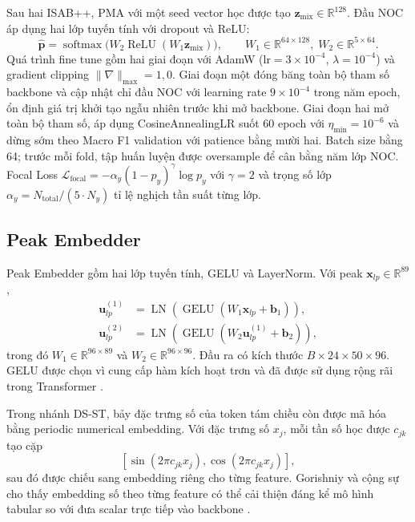 \documentclass[12pt,a4paper]{article}
\begin{document}
Sau hai ISAB++, PMA với một seed vector học được tạo $\bm{z}_{\mathrm{mix}}\in\mathbb{R}^{128}$. Đầu NOC áp dụng hai lớp tuyến tính với dropout và ReLU:
\begin{equation}
\hat{\bm{p}} = \operatorname{softmax}\!\bigl(W_2\operatorname{ReLU}(W_1\bm{z}_{\mathrm{mix}})\bigr),
\qquad W_1\in\mathbb{R}^{64\times128},\;W_2\in\mathbb{R}^{5\times64}.
\end{equation}
Quá trình fine tune gồm hai giai đoạn với AdamW ($\text{lr}=3\times10^{-4}$, $\lambda=10^{-4}$) và gradient clipping $\|\nabla\|_{\max}=1{,}0$. Giai đoạn một đóng băng toàn bộ tham số backbone và cập nhật chỉ đầu NOC với learning rate $9\times10^{-4}$ trong năm epoch, ổn định giá trị khởi tạo ngẫu nhiên trước khi mở backbone. Giai đoạn hai mở toàn bộ tham số, áp dụng CosineAnnealingLR suốt 60 epoch với $\eta_{\min}=10^{-6}$ và dừng sớm theo Macro F1 validation với patience bằng mười hai. Batch size bằng 64; trước mỗi fold, tập huấn luyện được oversample để cân bằng năm lớp NOC. Focal Loss $\mathcal{L}_{\mathrm{focal}} = -\alpha_y(1-p_y)^{\gamma}\log p_y$ với $\gamma=2$ và trọng số lớp $\alpha_y = N_{\mathrm{total}}/(5\cdot N_y)$ tỉ lệ nghịch tần suất từng lớp.

\subsection{Peak Embedder}

Peak Embedder gồm hai lớp tuyến tính, GELU và LayerNorm. Với peak \(\bm{x}_{lp}\in\mathbb{R}^{89}\),
\begin{align}
\bm{u}^{(1)}_{lp}&=\operatorname{LN}\left(\operatorname{GELU}(W_1\bm{x}_{lp}+\bm{b}_1)\right),\\
\bm{u}^{(2)}_{lp}&=\operatorname{LN}\left(\operatorname{GELU}(W_2\bm{u}^{(1)}_{lp}+\bm{b}_2)\right),
\end{align}
trong đó \(W_1\in\mathbb{R}^{96\times89}\) và \(W_2\in\mathbb{R}^{96\times96}\). Đầu ra có kích thước \(B\times24\times50\times96\). GELU được chọn vì cung cấp hàm kích hoạt trơn và đã được sử dụng rộng rãi trong Transformer \cite{hendrycks2016}.

Trong nhánh DS-ST, bảy đặc trưng số của token tám chiều còn được mã hóa bằng periodic numerical embedding. Với đặc trưng số \(x_j\), mỗi tần số học được \(c_{jk}\) tạo cặp
\begin{equation}
\left[\sin(2\pi c_{jk}x_j),\cos(2\pi c_{jk}x_j)\right],
\end{equation}
sau đó được chiếu sang embedding riêng cho từng feature. Gorishniy và cộng sự cho thấy embedding số theo từng feature có thể cải thiện đáng kể mô hình tabular so với đưa scalar trực tiếp vào backbone \cite{gorishniy2022}.
\end{document}
